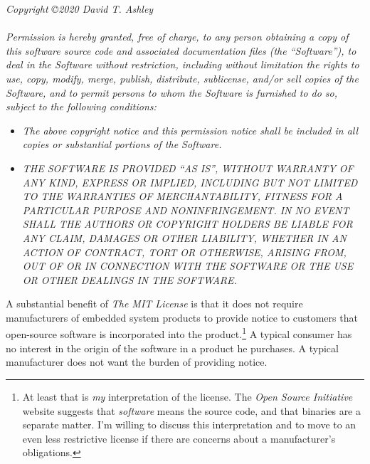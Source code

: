 \begin{small}
\noindent{}\emph{Copyright \copyright 2020 David T. Ashley}\\\\
\noindent{}\emph{Permission is hereby granted, free of charge, to any person obtaining a copy
of this software source code and associated documentation files (the
``Software''), to deal in the Software without restriction, including without
limitation the rights to use, copy, modify, merge, publish, distribute,
sublicense, and/or sell copies of the Software, and to permit persons to whom
the Software is furnished to do so, subject to the following conditions:}

\begin{itemize}
\item \emph{The above copyright notice and this permission notice shall be included in
      all copies or substantial portions of the Software.}
\item \emph{THE SOFTWARE IS PROVIDED ``AS IS'', WITHOUT WARRANTY OF ANY KIND, EXPRESS OR
      IMPLIED, INCLUDING BUT NOT LIMITED TO THE WARRANTIES OF MERCHANTABILITY,
      FITNESS FOR A PARTICULAR PURPOSE AND NONINFRINGEMENT\@. IN NO EVENT SHALL THE
      AUTHORS OR COPYRIGHT HOLDERS BE LIABLE FOR ANY CLAIM, DAMAGES OR OTHER
      LIABILITY, WHETHER IN AN ACTION OF CONTRACT, TORT OR OTHERWISE, ARISING FROM,
      OUT OF OR IN CONNECTION WITH THE SOFTWARE OR THE USE OR OTHER DEALINGS IN
      THE SOFTWARE.}
\end{itemize}
\end{small}

A substantial benefit of \emph{The MIT License} is that it does not require manufacturers
of embedded system products to provide notice to customers that open-source
software is incorporated into the product.\footnote{At least that is \emph{my} interpretation
of the license.  The \emph{Open Source Initiative} website suggests that \emph{software} means
the source code, and that binaries are a separate matter.  I'm willing to discuss
this interpretation and to move to an even less restrictive license if there are
concerns about a manufacturer's obligations.}  A typical consumer has no interest in the
origin of the software in a product he purchases.  A typical manufacturer does not want
the burden of providing notice.

